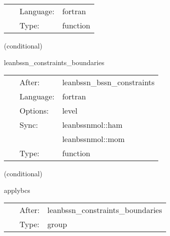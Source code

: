 \hspace{5mm}{\it compute constraints } 


\hspace{5mm}

 \begin{tabular*}{160mm}{cll} 
~ & Language:  & fortran \\ 
~ & Type:  & function \\ 
\end{tabular*} 


\vspace{5mm}

   (conditional) 

\hspace{5mm} leanbssn\_constraints\_boundaries 

\hspace{5mm}{\it enforce symmetry bcs in constraint computation } 


\hspace{5mm}

 \begin{tabular*}{160mm}{cll} 
~ & After:  & leanbssn\_bssn\_constraints \\ 
~ & Language:  & fortran \\ 
~ & Options:  & level \\ 
~ & Sync:  & leanbssnmol::ham \\ 
~& ~ &leanbssnmol::mom\\ 
~ & Type:  & function \\ 
\end{tabular*} 


\vspace{5mm}

   (conditional) 

\hspace{5mm} applybcs 

\hspace{5mm}{\it apply boundary conditions } 


\hspace{5mm}

 \begin{tabular*}{160mm}{cll} 
~ & After:  & leanbssn\_constraints\_boundaries \\ 
~ & Type:  & group \\ 
\end{tabular*} 


\vspace{5mm}

